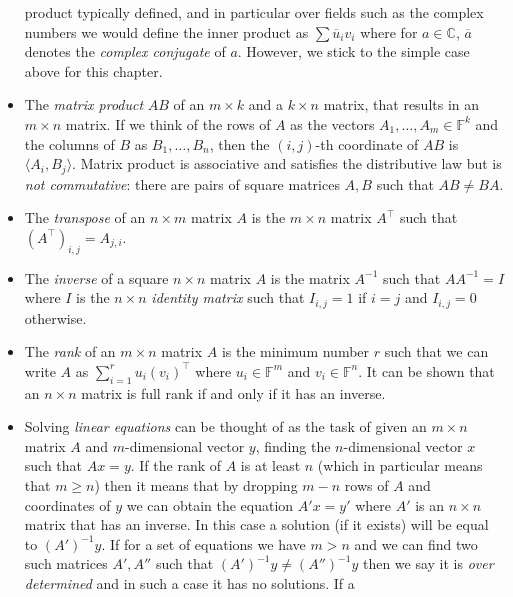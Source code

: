 \begin{itemize}
{    product typically defined, and in particular over fields such as the
    complex numbers we would define the inner product as
    \(\sum \overline{u}_i v_i\) where for \(a\in \mathbb{C}\),
    \(\overline{a}\) denotes the \emph{complex conjugate} of \(a\).
    However, we stick to the simple case above for this chapter.}
\item
  The \emph{matrix product} \(\ensuremath{\mathit{AB}}\) of an
  \(m \times k\) and a \(k\times n\) matrix, that results in an
  \(m\times n\) matrix. If we think of the rows of \(A\) as the vectors
  \(A_1,\ldots,A_m \in \mathbb{F}^k\) and the columns of \(B\) as
  \(B_1,\ldots,B_n\), then the \((i,j)\)-th coordinate of
  \(\ensuremath{\mathit{AB}}\) is \(\langle A_i , B_j \rangle\). Matrix
  product is associative and satisfies the distributive law but is
  \emph{not commutative}: there are pairs of square matrices \(A,B\)
  such that \(\ensuremath{\mathit{AB}} \neq \ensuremath{\mathit{BA}}\).
\item
  The \emph{transpose} of an \(n\times m\) matrix \(A\) is the
  \(m\times n\) matrix \(A^\top\) such that
  \((A^\top)_{i,j} = A_{j,i}\).
\item
  The \emph{inverse} of a square \(n\times n\) matrix \(A\) is the
  matrix \(A^{-1}\) such that \(\ensuremath{\mathit{AA}}^{-1} = I\)
  where \(I\) is the \(n\times n\) \emph{identity matrix} such that
  \(I_{i,j}=1\) if \(i=j\) and \(I_{i,j}=0\) otherwise.
\item
  The \emph{rank} of an \(m\times n\) matrix \(A\) is the minimum number
  \(r\) such that we can write \(A\) as \(\sum_{i=1}^r u_i(v_i)^\top\)
  where \(u_i \in \mathbb{F}^m\) and \(v_i \in \mathbb{F}^n\). It can be
  shown that an \(n\times n\) matrix is full rank if and only if it has
  an inverse.
\item
  Solving \emph{linear equations} can be thought of as the task of given
  an \(m \times n\) matrix \(A\) and \(m\)-dimensional vector \(y\),
  finding the \(n\)-dimensional vector \(x\) such that \(Ax = y\). If
  the rank of \(A\) is at least \(n\) (which in particular means that
  \(m \geq n\)) then it means that by dropping \(m-n\) rows of \(A\) and
  coordinates of \(y\) we can obtain the equation \(A'x = y'\) where
  \(A'\) is an \(n\times n\) matrix that has an inverse. In this case a
  solution (if it exists) will be equal to \((A')^{-1}y\). If for a set
  of equations we have \(m>n\) and we can find two such matrices
  \(A',A''\) such that \((A')^{-1}y \neq (A'')^{-1}y\) then we say it is
  \emph{over determined} and in such a case it has no solutions. If a

\end{itemize}
